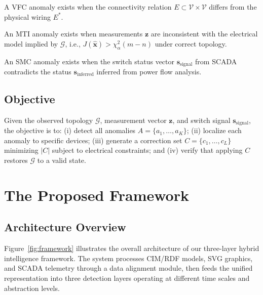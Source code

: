 \documentclass[research]{fcs}
\begin{document}
\begin{definition}
A VFC anomaly exists when the connectivity relation $E \subset \mathcal{V} \times \mathcal{V}$ differs from the physical wiring $E^*$.
\end{definition}

\begin{definition}
An MTI anomaly exists when measurements $\mathbf{z}$ are inconsistent with the electrical model implied by $\mathcal{G}$, i.e., $J(\hat{\mathbf{x}}) > \chi^2_\alpha(m-n)$ under correct topology.
\end{definition}

\begin{definition}
An SMC anomaly exists when the switch status vector $\mathbf{s}_{\text{signal}}$ from SCADA contradicts the status $\mathbf{s}_{\text{inferred}}$ inferred from power flow analysis.
\end{definition}

\subsection{Objective}

Given the observed topology $\mathcal{G}$, measurement vector $\mathbf{z}$, and switch signal $\mathbf{s}_{\text{signal}}$, the objective is to: (i) detect all anomalies $A = \{a_1, \ldots, a_K\}$; (ii) localize each anomaly to specific devices; (iii) generate a correction set $C = \{c_1, \ldots, c_L\}$ minimizing $|C|$ subject to electrical constraints; and (iv) verify that applying $C$ restores $\mathcal{G}$ to a valid state.

\section{The Proposed Framework}

\subsection{Architecture Overview}

Figure~\ref{fig:framework} illustrates the overall architecture of our three-layer hybrid intelligence framework. The system processes CIM/RDF models, SVG graphics, and SCADA telemetry through a data alignment module, then feeds the unified representation into three detection layers operating at different time scales and abstraction levels.
\end{document}
